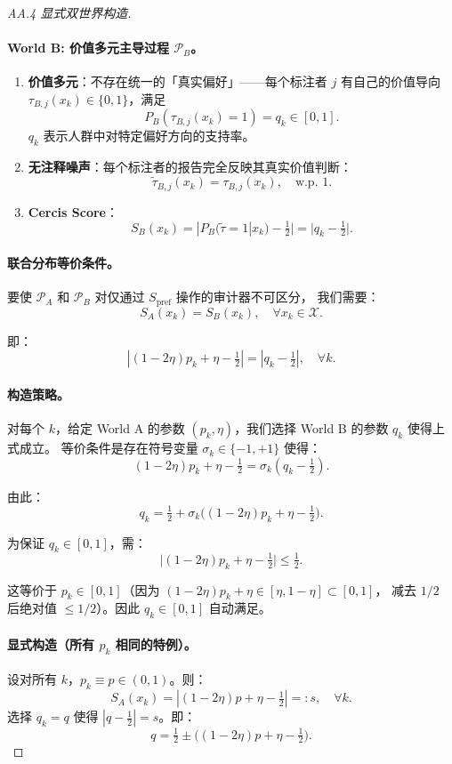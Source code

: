 \documentclass[12pt,a4paper]{article}
\newcommand{\cX}{\mathcal{X}}
\begin{document}
\begin{proof}[AA.4 显式双世界构造]
\paragraph{World B: 价值多元主导过程 $\mathcal{P}_B$。}
\begin{enumerate}
    \item \textbf{价值多元}：不存在统一的「真实偏好」——每个标注者
          $j$ 有自己的价值导向 $\tau_{B,j}(x_k) \in \{0,1\}$，满足
          \[
          P_B(\tau_{B,j}(x_k)=1) = q_k \in [0,1].
          \]
          $q_k$ 表示人群中对特定偏好方向的支持率。
    \item \textbf{无注释噪声}：每个标注者的报告完全反映其真实价值判断：
          \[
          \tilde{\tau}_{B,j}(x_k) = \tau_{B,j}(x_k), \quad \text{w.p. } 1.
          \]
    \item \textbf{Cercis Score}：
          \[
          S_B(x_k) = |P_B(\tilde{\tau}=1|x_k) - \tfrac12| = |q_k - \tfrac12|.
          \]
\end{enumerate}

\paragraph{联合分布等价条件。}
要使 $\mathcal{P}_A$ 和 $\mathcal{P}_B$ 对仅通过 $S_{\mathrm{pref}}$ 操作的审计器不可区分，
我们需要：
\[
S_A(x_k) = S_B(x_k), \quad \forall x_k \in \cX.
\]

即：
\[
|(1-2\eta)p_k + \eta - \tfrac12| = |q_k - \tfrac12|, \quad \forall k.
\]

\paragraph{构造策略。}
对每个 $k$，给定 World A 的参数 $(p_k, \eta)$，我们选择 World B 的参数 $q_k$ 使得上式成立。
等价条件是存在符号变量 $\sigma_k \in \{-1, +1\}$ 使得：
\[
(1-2\eta)p_k + \eta - \tfrac12 = \sigma_k (q_k - \tfrac12).
\]

由此：
\[
q_k = \tfrac12 + \sigma_k\bigl((1-2\eta)p_k + \eta - \tfrac12\bigr).
\]

为保证 $q_k \in [0,1]$，需：
\[
\bigl|(1-2\eta)p_k + \eta - \tfrac12\bigr| \leq \tfrac12.
\]

这等价于 $p_k \in [0,1]$（因为 $(1-2\eta)p_k + \eta \in [\eta, 1-\eta] \subset [0,1]$，
减去 $1/2$ 后绝对值 $\leq 1/2$）。因此 $q_k \in [0,1]$ 自动满足。

\paragraph{显式构造（所有 $p_k$ 相同的特例）。}
设对所有 $k$，$p_k \equiv p \in (0,1)$。则：
\[
S_A(x_k) = |(1-2\eta)p + \eta - \tfrac12| =: s, \quad \forall k.
\]
选择 $q_k = q$ 使得 $|q - \tfrac12| = s$。即：
\[
q = \tfrac12 \pm \bigl((1-2\eta)p + \eta - \tfrac12\bigr).
\]


\end{proof}
\end{document}
